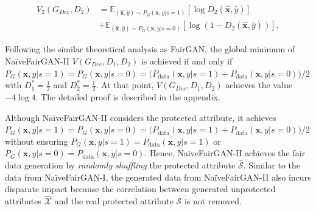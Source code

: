 \documentclass[sigconf]{acmart}
\theoremstyle{definition}
\begin{document}
\begin{equation*}
\begin{split}
	V_2(G_{Dec}, D_2) & = \mathbb{E}_{(\hat{\mathbf{x}},\hat{y}) \sim P_G (\mathbf{x},y|s=1)}[\log D_2(\hat{\mathbf{x}},\hat{y})] \\
			 & + \mathbb{E}_{(\hat{\mathbf{x}},\hat{y}) \sim P_G (\mathbf{x},y|s=0)}[\log (1-D_2(\hat{\mathbf{x}},\hat{y}))],
\end{split}
\end{equation*}

Following the similar theoretical analysis as FairGAN, the global minimum of Na\"iveFairGAN-II $V(G_{Dec}, D_1, D_2)$ is achieved if and only if $P_{G}(\mathbf{x},y|s=1) = P_{G}(\mathbf{x},y|s=0) = \big(P_{\text{data}}(\mathbf{x},y|s=1)+P_{\text{data}}(\mathbf{x},y|s=0)\big)/2$ with $D_1^*=\frac{1}{2}$ and $D_2^*=\frac{1}{2}$. At that point, $V(G_{Dec}, D_1, D_2)$ achieves the value $-4 \log4$. The detailed proof is described in the appendix. 

Although Na\"iveFairGAN-II considers the protected attribute, it achieves $P_{G}(\mathbf{x},y|s=1) = P_{G}(\mathbf{x},y|s=0) = \big(P_{\text{data}}(\mathbf{x},y|s=1)+P_{\text{data}}(\mathbf{x},y|s=0)\big)/2$ without ensuring $P_{G}(\mathbf{x},y|s=1) = P_{\text{data}}(\mathbf{x},y|s=1)$ or $P_{G}(\mathbf{x},y|s=0) = P_{\text{data}}(\mathbf{x},y|s=0)$. Hence, Na\"iveFairGAN-II achieves the fair data generation by \textit{randomly shuffling} the protected attribute $\hat{\mathcal{S}}$. Similar to the data from Na\"iveFairGAN-I, the generated data from Na\"iveFairGAN-II also incurs disparate impact because the correlation between generated unprotected attributes $\hat{\mathcal{X}}$ and the real protected attribute $\mathcal{S}$ is not removed. 
\end{document}
